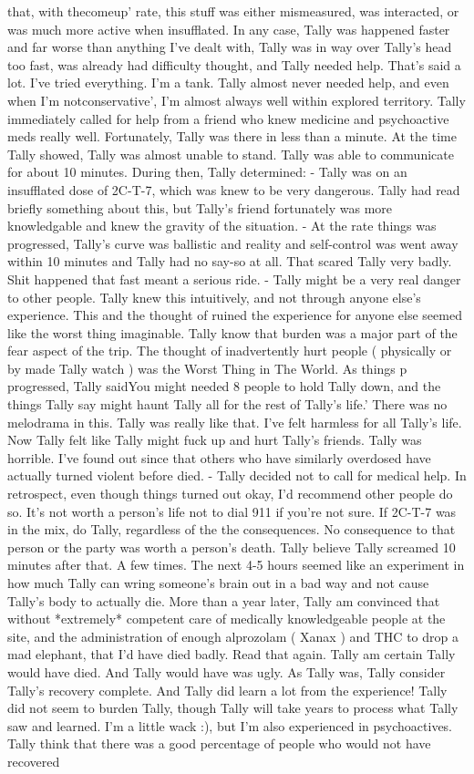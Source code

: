\documentclass[12pt]{book}
\begin{document}
that, with thecomeup' rate, this stuff was either mismeasured, was interacted, or was much more active when insufflated. In any case, Tally was happened faster and far worse than anything I've dealt with, Tally was in way over Tally's head too fast, was already had difficulty thought, and Tally needed help. That's said a lot. I've tried everything. I'm a tank. Tally almost never needed help, and even when I'm notconservative', I'm almost always well within explored territory. Tally immediately called for help from a friend who knew medicine and psychoactive meds really well. Fortunately, Tally was there in less than a minute. At the time Tally showed, Tally was almost unable to stand. Tally was able to communicate for about 10 minutes. During then, Tally determined: - Tally was on an insufflated dose of 2C-T-7, which was knew to be very dangerous. Tally had read briefly something about this, but Tally's friend fortunately was more knowledgable and knew the gravity of the situation. - At the rate things was progressed, Tally's curve was ballistic and reality and self-control was went away within 10 minutes and Tally had no say-so at all. That scared Tally very badly. Shit happened that fast meant a serious ride. - Tally might be a very real danger to other people. Tally knew this intuitively, and not through anyone else's experience. This and the thought of ruined the experience for anyone else seemed like the worst thing imaginable. Tally know that burden was a major part of the fear aspect of the trip. The thought of inadvertently hurt people ( physically or by made Tally watch ) was the Worst Thing in The World. As things p progressed, Tally saidYou might needed 8 people to hold Tally down, and the things Tally say might haunt Tally all for the rest of Tally's life.' There was no melodrama in this. Tally was really like that. I've felt harmless for all Tally's life. Now Tally felt like Tally might fuck up and hurt Tally's friends. Tally was horrible. I've found out since that others who have similarly overdosed have actually turned violent before died. - Tally decided not to call for medical help. In retrospect, even though things turned out okay, I'd recommend other people do so. It's not worth a person's life not to dial 911 if you're not sure. If 2C-T-7 was in the mix, do Tally, regardless of the the consequences. No consequence to that person or the party was worth a person's death. Tally believe Tally screamed 10 minutes after that. A few times. The next 4-5 hours seemed like an experiment in how much Tally can wring someone's brain out in a bad way and not cause Tally's body to actually die. More than a year later, Tally am convinced that without *extremely* competent care of medically knowledgeable people at the site, and the administration of enough alprozolam ( Xanax ) and THC to drop a mad elephant, that I'd have died badly. Read that again. Tally am certain Tally would have died. And Tally would have was ugly. As Tally was, Tally consider Tally's recovery complete. And Tally did learn a lot from the experience! Tally did not seem to burden Tally, though Tally will take years to process what Tally saw and learned. I'm a little wack :), but I'm also experienced in psychoactives. Tally think that there was a good percentage of people who would not have recovered 
\end{document}
